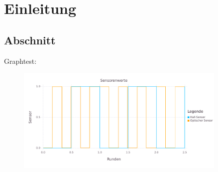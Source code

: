 \chapter{Einleitung}
\section{Abschnitt}
Graphtest:
\begin{figure}[hb] \centering
  \includegraphics[width=0.9\textwidth]{images/graph_test.pdf}
 \end{figure}
